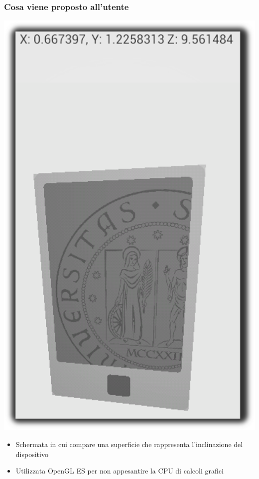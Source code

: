 \documentclass{beamer}
\begin{document}
\begin{frame}
\frametitle{Cosa viene proposto all'utente}
\begin{minipage}[c]{.25\textwidth}
\includegraphics[scale=.18]{./img/opengl.png}
\end{minipage}\begin{minipage}[r]{.65\textwidth}
\begin{itemize}
  \item Schermata in cui compare una superficie che rappresenta l'inclinazione del dispositivo
  \item Utilizzata OpenGL ES per non appesantire la CPU di calcoli grafici
\end{itemize}
\end{minipage}
\end{frame}
\end{document}

